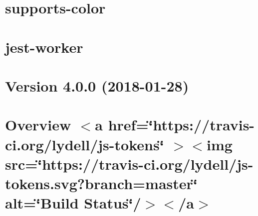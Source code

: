 \documentclass[twoside]{book}
\newcommand{\+}{\discretionary{\mbox{\scriptsize$\hookleftarrow$}}{}{}}
\begin{document}
\chapter{supports-\/color}
\label{md__c___users_vaishnavi_jadhav__desktop__developer_code_mean_stack_example_client_node_modules_j5dd0fccb0656d884504b58c8afe171aa}

\chapter{jest-\/worker}
\label{md__c___users_vaishnavi_jadhav__desktop__developer_code_mean_stack_example_client_node_modules_jest_worker__r_e_a_d_m_e}

\chapter{Version 4.0.0 (2018-\/01-\/28)}
\label{md__c___users_vaishnavi_jadhav__desktop__developer_code_mean_stack_example_client_node_modules_js_tokens__c_h_a_n_g_e_l_o_g}

\chapter{Overview \texorpdfstring{$<$}{<}a href=\char`\"{}https\+://travis-\/ci.\+org/lydell/js-\/tokens\char`\"{} \texorpdfstring{$>$}{>}\texorpdfstring{$<$}{<}img src=\char`\"{}https\+://travis-\/ci.\+org/lydell/js-\/tokens.\+svg?branch=master\char`\"{} alt=\char`\"{}\+Build Status\char`\"{}/\texorpdfstring{$>$}{>}\texorpdfstring{$<$}{<}/a\texorpdfstring{$>$}{>}}
\label{md__c___users_vaishnavi_jadhav__desktop__developer_code_mean_stack_example_client_node_modules_js_tokens__r_e_a_d_m_e}

\end{document}
